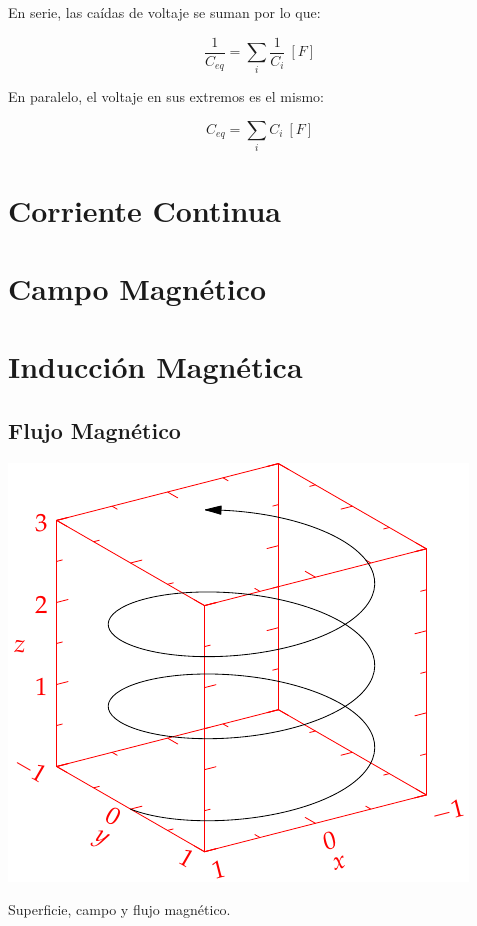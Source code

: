 \documentclass{tufte-handout}
\begin{document}
En serie, las caídas de voltaje se suman por lo que:

\begin{equation}
\frac{1}{C_{eq}} = \sum_i \frac{1}{C_i}~[F]
\end{equation}

En paralelo, el voltaje en sus extremos es el mismo:

\begin{equation}
C_{eq} = \sum_i C_i~[F]
\end{equation}

\clearpage

\section{Corriente Continua}

\clearpage

\section{Campo Magnético}

\clearpage

\section{Inducción Magnética}

\subsection{Flujo Magnético}

\begin{marginfigure}%
    \includegraphics[width=\linewidth]{helix}
    \caption{Superficie, campo y flujo magnético.}
    \label{fig:flujomagnetico}
\end{marginfigure}
\end{document}
